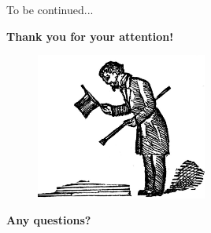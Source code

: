 \documentclass{beamer}
\begin{document}
{\begin{frame}{To be continued...}
	\begin{Large}
		\begin{center}
			\textbf{Thank you for your attention!}
		\end{center}
	\end{Large}	
	\begin{figure}[H]
		\centering
		\includegraphics[width=0.5\textwidth]{figures/final}
	\end{figure}
	\begin{Large}
		\begin{center}
			\textbf{Any questions?}
		\end{center}
	\end{Large}	
\end{frame}


}
\end{document}
